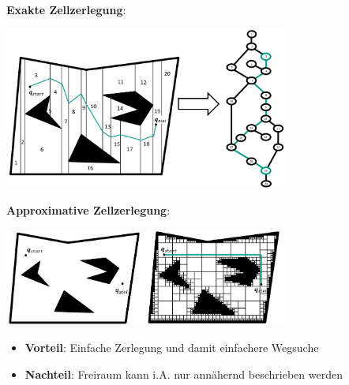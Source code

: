 \textbf{Exakte Zellzerlegung}:
\begin{center}
	\includegraphics[width=0.7\textwidth]{images/e-zz.png}
\end{center}
\pagebreak

\textbf{Approximative Zellzerlegung}:
\begin{center}
	\includegraphics[width=0.7\textwidth]{images/a-zz.png}
\end{center}
\begin{itemize}
	\item \textbf{Vorteil}: Einfache Zerlegung und damit einfachere Wegsuche
	\item \textbf{Nachteil}: Freiraum kann i.A. nur annähernd beschrieben werden
\end{itemize}